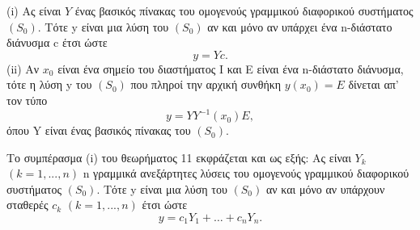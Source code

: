 \documentclass[11pt,a4paper,twoside]{book}
\newcommand{\titlefont}[1]{{\fontfamily{maksf}\selectfont #1}}
\newcounter{thewrhma}[chapter]
\renewcommand{\thethewrhma}{\thechapter.\arabic{thewrhma}}
\newcommand{\thewr}{\refstepcounter{thewrhma}{\bf\titlefont{\textcolor{secondarycolor}{\large Θεώρημα\hspace{2mm}\thethewrhma}}}\hspace{1mm}}{}
\newenvironment{Thewrhma}[1]
{\begin{tcolorbox}[title=\thewr\ \ :\ \  {\textcolor{black}{\bf{\large\titlefont{#1}}}},
breakable,
enhanced standard,
titlerule=-.2pt,
toprule=0pt, 
rightrule=0pt, 
bottomrule=0pt,
colback=white,
left=2mm,
top=1mm,
bottom=0mm,
boxrule=0pt,
colframe=white,
borderline west={1.5mm}{0pt}{secondarycolor},
leftrule=2mm,
sharp corners,
coltitle=secondarycolor]}
{\end{tcolorbox}}
\begin{document}
\begin{Thewrhma}{}
(i) Ας είναι $Y$ ένας βασικός πίνακας του ομογενούς γραμμικού διαφορικού συστήματος $(S_0)$. Τότε y είναι μια λύση του $(S_0)$ αν και μόνο αν υπάρχει ένα n-διάστατο διάνυσμα c έτσι ώστε
\[
y = Yc.
\]
(ii) Αν $x_0$ είναι ένα σημείο του διαστήματος Ι και Ε είναι ένα n-διάστατο διάνυσμα, τότε η λύση y του $(S_0)$ που πληροί την αρχική συνθήκη $y(x_0)=E$ δίνεται απ' τον τύπο
\[
y = Y Y^{-1}(x_0)E,
\]
όπου Y είναι ένας βασικός πίνακας του $(S_0)$.
\end{Thewrhma}

Το συμπέρασμα (i) του θεωρήματος 11 εκφράζεται και ως εξής:
Ας είναι $Y_k$ $(k=1,...,n)$ n γραμμικά ανεξάρτητες λύσεις του ομογενούς γραμμικού διαφορικού συστήματος $(S_0)$. Τότε y είναι μια λύση του $(S_0)$ αν και μόνο αν υπάρχουν σταθερές $c_k$ $(k=1,...,n)$ έτσι ώστε
\[
y = c_1Y_1 + \dots + c_nY_n.
\]
\end{document}
